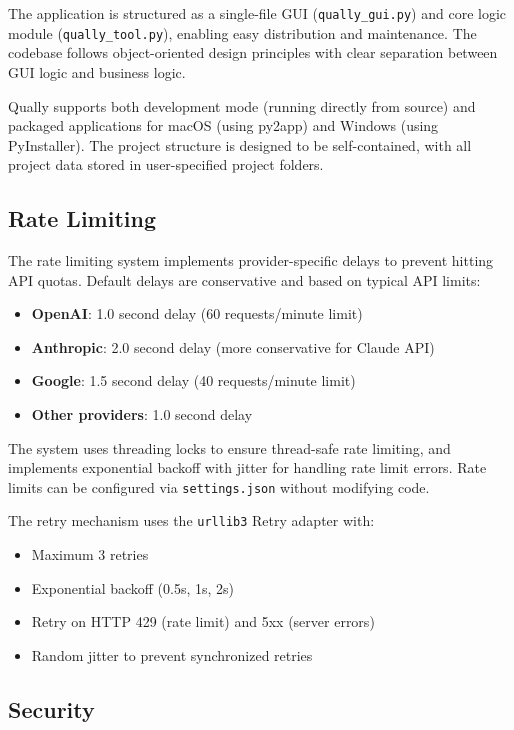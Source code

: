 \documentclass[11pt,a4paper]{article}
\begin{document}
The application is structured as a single-file GUI (\texttt{qually\_gui.py}) and core logic module (\texttt{qually\_tool.py}), enabling easy distribution and maintenance. The codebase follows object-oriented design principles with clear separation between GUI logic and business logic.

Qually supports both development mode (running directly from source) and packaged applications for macOS (using py2app) and Windows (using PyInstaller). The project structure is designed to be self-contained, with all project data stored in user-specified project folders.

\subsection{Rate Limiting}

The rate limiting system implements provider-specific delays to prevent hitting API quotas. Default delays are conservative and based on typical API limits:

\begin{itemize}
    \item \textbf{OpenAI}: 1.0 second delay (60 requests/minute limit)
    \item \textbf{Anthropic}: 2.0 second delay (more conservative for Claude API)
    \item \textbf{Google}: 1.5 second delay (40 requests/minute limit)
    \item \textbf{Other providers}: 1.0 second delay
\end{itemize}

The system uses threading locks to ensure thread-safe rate limiting, and implements exponential backoff with jitter for handling rate limit errors. Rate limits can be configured via \texttt{settings.json} without modifying code.

The retry mechanism uses the \texttt{urllib3} Retry adapter with:
\begin{itemize}
    \item Maximum 3 retries
    \item Exponential backoff (0.5s, 1s, 2s)
    \item Retry on HTTP 429 (rate limit) and 5xx (server errors)
    \item Random jitter to prevent synchronized retries
\end{itemize}

\subsection{Security}
\end{document}
